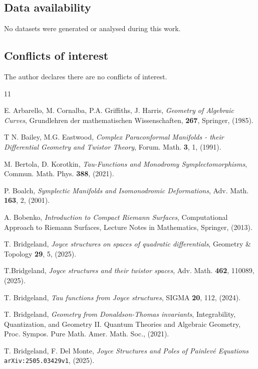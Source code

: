 \documentclass[a4paper,12pt,reqno]{amsart}
\numberwithin{equation}{section}
\numberwithin{counter2}{section}
\begin{document}
\subsection*{Data availability} No datasets were generated or analysed during this work.  
\subsection*{Conflicts of interest} The author declares there are no conﬂicts of interest.

\begin{thebibliography}{11}\raggedright

 E.  Arbarello,  M.  Cornalba,  P.A.  Griffiths,  J.  Harris,  
{\em Geometry of Algebraic Curves},  
Grundlehren der mathematischen Wissenschaften,  \textbf{267},  Springer,  (1985).  

 T N.  Bailey,  M.G.  Eastwood,  
{\em Complex Paraconformal Manifolds - their Differential Geometry and Twistor Theory},
Forum.  Math. \textbf{3}, 1,  (1991). 

 M.  Bertola,  D.  Korotkin,  
{\em Tau-Functions and Monodromy Symplectomorphisms},  
 Commun.  Math.  Phys.  \textbf{388},  (2021).

 P. Boalch,  
{\em Symplectic Manifolds and Isomonodromic Deformations},
Adv.  Math. {\bf 163},  2,  (2001).

 A.  Bobenko,  
{\em Introduction to Compact Riemann Surfaces}, 
Computational Approach to Riemann Surfaces,  Lecture Notes in Mathematics,  Springer,  (2013).  
 
 T.  Bridgeland,  
{\em Joyce structures on spaces of quadratic differentials},
Geometry \& Topology \textbf{29},  5, (2025).

 T.Bridgeland,  
{\em Joyce structures and their twistor spaces},  
Adv.  Math.  {\bf 462},  110089, (2025).  

 T.  Bridgeland,
{\em Tau functions from Joyce structures},
SIGMA \textbf{20},  112, (2024). 

 T.  Bridgeland, 
{\em Geometry from Donaldson-Thomas invariants},
 Integrability, Quantization, and Geometry
II.  Quantum Theories and Algebraic Geometry,  Proc.  Sympos.  Pure Math.  Amer.  Math.  Soc., (2021).

 T.  Bridgeland,  F.  Del Monte,  
 {\em Joyce Structures and Poles of Painlev\'{e} Equations}
 \texttt{arXiv:2505.03429v1},  (2025).


\end{thebibliography}
\end{document}
